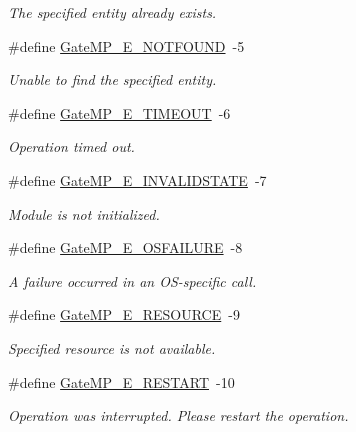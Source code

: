 \begin{DoxyCompactItemize}
\begin{DoxyCompactList}\small\item\em The specified entity already exists. \end{DoxyCompactList}\item 
\#define \hyperlink{_gate_m_p_8h_acdd82a5d634ec934ed7257eea8fb8d2c}{Gate\-M\-P\-\_\-\-E\-\_\-\-N\-O\-T\-F\-O\-U\-N\-D}~-\/5
\begin{DoxyCompactList}\small\item\em Unable to find the specified entity. \end{DoxyCompactList}\item 
\#define \hyperlink{_gate_m_p_8h_aaf80607f9e9ea4fba411e5693b0e8743}{Gate\-M\-P\-\_\-\-E\-\_\-\-T\-I\-M\-E\-O\-U\-T}~-\/6
\begin{DoxyCompactList}\small\item\em Operation timed out. \end{DoxyCompactList}\item 
\#define \hyperlink{_gate_m_p_8h_a075d7c582f213e960e44c25ff138ad85}{Gate\-M\-P\-\_\-\-E\-\_\-\-I\-N\-V\-A\-L\-I\-D\-S\-T\-A\-T\-E}~-\/7
\begin{DoxyCompactList}\small\item\em Module is not initialized. \end{DoxyCompactList}\item 
\#define \hyperlink{_gate_m_p_8h_a2eac3b6964fe569e41231fb2fea8b18d}{Gate\-M\-P\-\_\-\-E\-\_\-\-O\-S\-F\-A\-I\-L\-U\-R\-E}~-\/8
\begin{DoxyCompactList}\small\item\em A failure occurred in an O\-S-\/specific call. \end{DoxyCompactList}\item 
\#define \hyperlink{_gate_m_p_8h_ad07430b772c1d95c5ef2425b6c280fd9}{Gate\-M\-P\-\_\-\-E\-\_\-\-R\-E\-S\-O\-U\-R\-C\-E}~-\/9
\begin{DoxyCompactList}\small\item\em Specified resource is not available. \end{DoxyCompactList}\item 
\#define \hyperlink{_gate_m_p_8h_a77205c8c44ab3edc4557cc4521cb3d04}{Gate\-M\-P\-\_\-\-E\-\_\-\-R\-E\-S\-T\-A\-R\-T}~-\/10
\begin{DoxyCompactList}\small\item\em Operation was interrupted. Please restart the operation. \end{DoxyCompactList}\end{DoxyCompactItemize}
